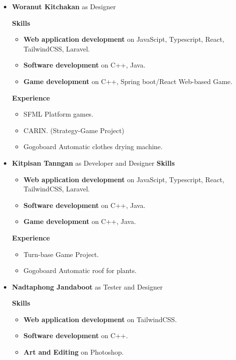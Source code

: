 \documentclass[ 10pt]{report}
\begin{document}
\begin{itemize}
                \item \textbf{Woranut Kitchakan} as Designer

                \textbf{Skills}
                \begin{itemize}
                    \item \textbf{Web application development} on JavaScipt, Typescript, React, TailwindCSS, Laravel.
                    \item \textbf{Software development} on C++, Java.
                    \item \textbf{Game development} on C++, Spring boot/React Web-based Game.
                \end{itemize}

                \textbf{Experience}
                \begin{itemize}
                    \item SFML Platform games.
                    \item CARIN. (Strategy-Game Project)
                    \item Gogoboard Automatic clothes drying machine.
                \end{itemize}

            \item \textbf{Kitpisan Tanngan} as Developer and Designer
                \textbf{Skills}
                \begin{itemize}
                    \item \textbf{Web application development} on JavaScipt, Typescript, React, TailwindCSS, Laravel.
                    \item \textbf{Software development} on  C++, Java.
                    \item \textbf{Game development} on C++, Java.
                \end{itemize}
            
                \textbf{Experience}
                \begin{itemize}
                    \item Turn-base Game Project.
                    \item Gogoboard Automatic roof for plants.
                \end{itemize}

            \item \textbf{Nadtaphong Jandaboot} as Tester and Designer
            
                \textbf{Skills}
                \begin{itemize}
                    \item \textbf{Web application development} on TailwindCSS.
                    \item \textbf{Software development} on C++.
                    \item \textbf{Art and Editing} on Photoshop. 
                \end{itemize}


\end{itemize}
\end{document}
